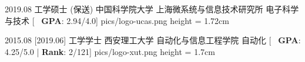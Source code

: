 \begin{educations}
    \education
    {2019.08}
    {工学硕士 (保送)}
    {中国科学院大学}
    {上海微系统与信息技术研究所}
    {电子科学与技术}
    [\textbullet ~ \textbf{GPA}: 2.94/4.0]
    {pics/logo-ucas.png} {height = 1.72cm}

    \separator{0.5ex}
    \education
    {2015.08}
    [2019.06]
    {工学学士}
    {西安理工大学}
    {自动化与信息工程学院}
    {自动化}
    [\textbullet ~ \textbf{GPA}: 4.25/5.0 | \textbf{Rank}: 2/121]
    {pics/logo-xut.png} {height = 1.7cm}

\end{educations}